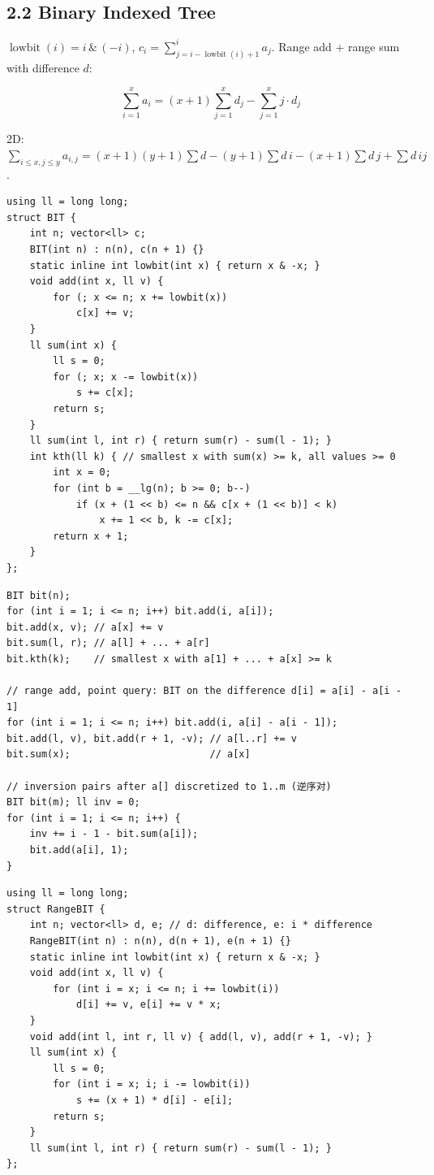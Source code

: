 \documentclass[8pt]{extarticle}
\begin{document}
\begin{multicols*}{3}
\subsection*{2.2 Binary Indexed Tree}

$\operatorname{lowbit}(i) = i \,\&\, (-i)$, $c_i = \sum_{j = i - \operatorname{lowbit}(i) + 1}^{i} a_j$. Range add + range sum with difference $d$:


\[\sum_{i=1}^{x} a_i = (x+1) \sum_{j=1}^{x} d_j - \sum_{j=1}^{x} j \cdot d_j\]

2D: $\sum_{i \le x, j \le y} a_{i,j} = (x+1)(y+1)\sum d - (y+1)\sum d \, i - (x+1)\sum d \, j + \sum d \, ij$.


\begin{lstlisting}
using ll = long long;
struct BIT {
    int n; vector<ll> c;
    BIT(int n) : n(n), c(n + 1) {}
    static inline int lowbit(int x) { return x & -x; }
    void add(int x, ll v) {
        for (; x <= n; x += lowbit(x))
            c[x] += v;
    }
    ll sum(int x) {
        ll s = 0;
        for (; x; x -= lowbit(x))
            s += c[x];
        return s;
    }
    ll sum(int l, int r) { return sum(r) - sum(l - 1); }
    int kth(ll k) { // smallest x with sum(x) >= k, all values >= 0
        int x = 0;
        for (int b = __lg(n); b >= 0; b--)
            if (x + (1 << b) <= n && c[x + (1 << b)] < k)
                x += 1 << b, k -= c[x];
        return x + 1;
    }
};
\end{lstlisting}

\begin{lstlisting}
BIT bit(n);
for (int i = 1; i <= n; i++) bit.add(i, a[i]);
bit.add(x, v); // a[x] += v
bit.sum(l, r); // a[l] + ... + a[r]
bit.kth(k);    // smallest x with a[1] + ... + a[x] >= k

// range add, point query: BIT on the difference d[i] = a[i] - a[i - 1]
for (int i = 1; i <= n; i++) bit.add(i, a[i] - a[i - 1]);
bit.add(l, v), bit.add(r + 1, -v); // a[l..r] += v
bit.sum(x);                        // a[x]

// inversion pairs after a[] discretized to 1..m (逆序对)
BIT bit(m); ll inv = 0;
for (int i = 1; i <= n; i++) {
    inv += i - 1 - bit.sum(a[i]);
    bit.add(a[i], 1);
}
\end{lstlisting}

\begin{lstlisting}
using ll = long long;
struct RangeBIT {
    int n; vector<ll> d, e; // d: difference, e: i * difference
    RangeBIT(int n) : n(n), d(n + 1), e(n + 1) {}
    static inline int lowbit(int x) { return x & -x; }
    void add(int x, ll v) {
        for (int i = x; i <= n; i += lowbit(i))
            d[i] += v, e[i] += v * x;
    }
    void add(int l, int r, ll v) { add(l, v), add(r + 1, -v); }
    ll sum(int x) {
        ll s = 0;
        for (int i = x; i; i -= lowbit(i))
            s += (x + 1) * d[i] - e[i];
        return s;
    }
    ll sum(int l, int r) { return sum(r) - sum(l - 1); }
};
\end{lstlisting}


\end{multicols*}
\end{document}
